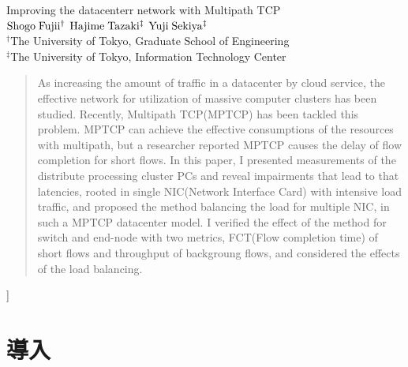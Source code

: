 \documentclass[11pt, a4paper, twocolumn]{jsarticle}
\begin{document}
\begin{center}
{\Large Improving the datacenterr network with Multipath TCP }\\
\vspace{1em}
{\large ${\rm Shogo\;Fujii^{\dagger}}$
\hspace{1.0cm}${\rm Hajime\;Tazaki^{\ddagger}}$ \hspace{1.0cm}
${\rm Yuji\;Sekiya^{\ddagger}}$}\\
${}^{\dagger}$The University of Tokyo, Graduate School of Engineering\\
${}^{\ddagger}$The University of Tokyo, Information Technology
Center \\
\end{center}
\begin{quotation}
\begin{spacing}{0.6}
{\footnotesize
As increasing the amount of traffic in a datacenter by cloud service, the
effective network for utilization of massive computer clusters has been studied.
Recently, Multipath TCP(MPTCP) has been tackled this problem.
MPTCP can achieve the effective consumptions of the resources with multipath,
but a researcher reported MPTCP causes the delay of flow completion for short
flows.
In this paper, I presented measurements of the distribute processing cluster PCs
and reveal impairments that lead to that latencies, rooted in single NIC(Network
Interface Card) with intensive load traffic, and proposed the method balancing
the load for multiple NIC, in such a MPTCP datacenter model.
I verified the effect of the method for switch and end-node with two metrics,
FCT(Flow completion time) of short flows and throughput of backgroung flows,
and considered the effects of the load balancing.
}
\end{spacing}
\end{quotation}

\vspace{1.5cm}
]


\section{導入}
\end{document}
